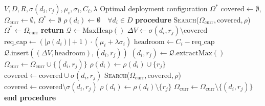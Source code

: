 \documentclass[conference]{IEEEtran}
\begin{document}
\begin{algorithm}[t]
\caption{CC-SCP Priority-Queue Backtracking Search}
\label{alg:cc_scp}
\begin{algorithmic}[1]
\REQUIRE $V, D, R, \sigma(d_i, r_j), \mu_i, \sigma_i, C_i, \lambda$
\ENSURE Optimal deployment configuration $\Omega^*$
\STATE $\text{covered} \leftarrow \emptyset$, $\Omega_{\text{curr}} \leftarrow \emptyset$, $\Omega^* \leftarrow \emptyset$
\STATE $\rho(d_i) \leftarrow \emptyset \quad \forall d_i \in D$
\STATE \textbf{procedure} \textsc{Search}($\Omega_{\text{curr}}, \text{covered}, \rho$)
        \STATE $\Omega^* \leftarrow \Omega_{\text{curr}}$
    \ENDIF
    \STATE \textbf{return}
\ENDIF
\STATE $\mathcal{Q} \leftarrow \text{MaxHeap}()$
        \STATE $\Delta V \leftarrow \sigma(d_i, r_j) \setminus \text{covered}$
        \STATE $\text{req\_cap} \leftarrow (|\rho(d_i)| + 1) \cdot (\mu_i + \lambda\sigma_i)$
            \STATE $\text{headroom} \leftarrow C_i - \text{req\_cap}$
            \STATE $\mathcal{Q}.\text{insert}((\Delta V, \text{headroom}), (d_i, r_j))$
        \ENDIF
    \ENDFOR
\ENDFOR
{}
    \STATE $(d_i, r_j) \leftarrow \mathcal{Q}.\text{extractMax}()$
    \STATE $\Omega_{\text{curr}} \leftarrow \Omega_{\text{curr}} \cup \{(d_i, r_j)\}$
    \STATE $\rho(d_i) \leftarrow \rho(d_i) \cup \{r_j\}$
    \STATE $\text{covered} \leftarrow \text{covered} \cup \sigma(d_i, r_j)$
    \STATE \textsc{Search}($\Omega_{\text{curr}}, \text{covered}, \rho$)
    \STATE $\text{covered} \leftarrow \text{covered} \setminus \sigma(d_i, r_j)$
    \STATE $\rho(d_i) \leftarrow \rho(d_i) \setminus \{r_j\}$
    \STATE $\Omega_{\text{curr}} \leftarrow \Omega_{\text{curr}} \setminus \{(d_i, r_j)\}$
\ENDWHILE
\STATE \textbf{end procedure}
\end{algorithmic}
\end{algorithm}
\end{document}
